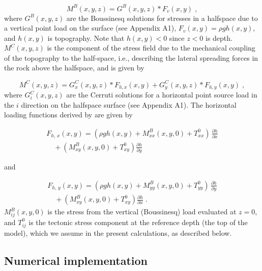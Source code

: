 \documentclass[draft,jgrga]{AGUTeX}
\begin{document}
\begin{article}
\begin{equation}
M^B(x, y, z) = G^B(x,y,z) * F_v(x, y) \; ,
\label{eqn:bous}
\end{equation}
where $G^B(x,y,z)$ are the Boussinesq solutions for stresses in a
halfspace due to a vertical point load on the surface (see Appendix A1), 
$F_v(x,y) = \rho g h(x,y)$, and $h(x,y)$ is topography. 
Note that $h(x,y)<0$ since $z<0$ is
depth. $M^C(x,y,z)$ is the component of the stress field due to the
mechanical coupling of the topography to the half-space, i.e.,
describing the lateral spreading forces in the rock above the halfspace,
and is given by

\begin{equation}
M^C(x, y, z) = G_x^C(x,y,z) * F_{h, x}(x, y) + G_y^C(x,y,z) * F_{h, y}(x, y) \; ,
\end{equation}
where $G_i^C(x,y,z)$ are the Cerruti solutions for a horizontal point
source load in the $i$ direction on the halfspace surface (see
Appendix A1). The horizontal loading functions derived by
\citet{liuzoback1992} are given by

\begin{equation}
\begin{split}
F_{h, \, x}(x,y) = ( \rho g h(x,y) + M_{xx}^B(x,y,0) + T^0_{xx} )\, \frac{\partial h}{ \partial x} \\
\quad + (M_{xy}^{B}(x,y,0) + T^0_{xy}) \frac{\partial h}{ \partial y}
\end{split}
\label{eqn:f_hor_xz}
\end{equation}

and

\begin{equation}
\begin{split}
F_{h, \, y}(x,y) = ( \rho g h(x,y) + M_{yy}^B(x,y,0) + T^0_{yy} )\, \frac{\partial h}{ \partial y} \\
\quad + (M_{xy}^{B}(x,y,0) + T^0_{xy}) \frac{\partial h}{ \partial x}\; . 
\end{split}
\label{eqn:f_hor_yz}
\end{equation}
$M_{ij}^B(x,y,0)$ is the stress from the vertical (Boussinesq) load
evaluated at $z=0$, and $T^0_{ij}$ is the tectonic stress component at the
reference depth (the top of the model), which we assume in the present 
calculations, as described below.

\subsection{Numerical implementation}\label{numerical-implementation}


\end{article}
\end{document}
